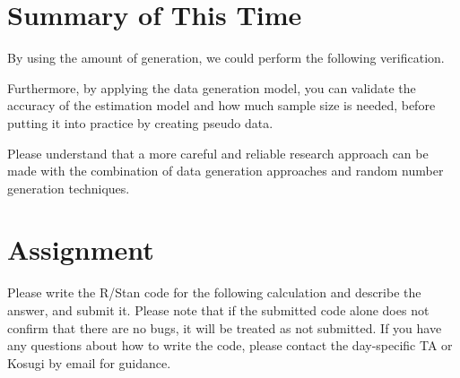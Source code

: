 \documentclass{ltjsbook}
\begin{document}
\section{Summary of This Time}
By using the amount of generation, we could perform the following verification.

Furthermore, by applying the data generation model, you can validate the accuracy of the estimation model and how much sample size is needed, before putting it into practice by creating pseudo data.

Please understand that a more careful and reliable research approach can be made with the combination of data generation approaches and random number generation techniques.

\section{Assignment}
Please write the R/Stan code for the following calculation and describe the answer, and submit it. Please note that if the submitted code alone does not confirm that there are no bugs, it will be treated as not submitted. If you have any questions about how to write the code, please contact the day-specific TA or Kosugi by email for guidance.


\end{document}

